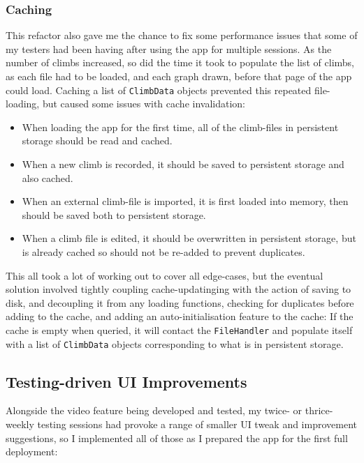 \subsubsection{Caching}
This refactor also gave me the chance to fix some performance issues that some of my testers had been having after using the app for multiple sessions.
As the number of climbs increased, so did the time it took to populate the list of climbs, as each file had to be loaded, and each graph drawn, before that page of the app could load.
Caching a list of \verb|ClimbData| objects prevented this repeated file-loading, but caused some issues with cache invalidation:
\begin{itemize}
    \item When loading the app for the first time, all of the climb-files in persistent storage should be read and cached.
    \item When a new climb is recorded, it should be saved to persistent storage and also cached.
    \item When an external climb-file is imported, it is first loaded into memory, then should be saved both to persistent storage.
    \item When a climb file is edited, it should be overwritten in persistent storage, but is already cached so should not be re-added to prevent duplicates.
\end{itemize}
This all took a lot of working out to cover all edge-cases, but the eventual solution involved tightly coupling cache-updatinging with the action of saving to disk, and decoupling it from any loading functions, checking for duplicates before adding to the cache, and adding an auto-initialisation feature to the cache:
If the cache is empty when queried, it will contact the \verb|FileHandler| and populate itself with a list of \verb|ClimbData| objects corresponding to what is in persistent storage.




\subsection{Testing-driven UI Improvements}
Alongside the video feature being developed and tested, my twice- or thrice-weekly testing sessions had provoke a range of smaller UI tweak and improvement suggestions, so I implemented all of those as I prepared the app for the first full deployment:

